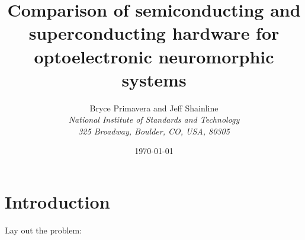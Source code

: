 \documentclass[onecolumn]{article}
\title{Comparison of semiconducting and superconducting hardware for optoelectronic neuromorphic systems}
\author[1]{\Large{Bryce Primavera and Jeff Shainline}
\\
\textit{\large{National Institute of Standards and Technology}}
\\
\vspace{-0.2em}
\textit{\large{325 Broadway, Boulder, CO, USA, 80305}}
\\
}
\date{\today}%
\begin{document}
\maketitle
\begin{abstract}
\vspace{3em}
\end{abstract}

	
\setcounter{tocdepth}{3}
\setcounter{secnumdepth}{4}
\tableofcontents	
	
\section{\label{sec:introduction}Introduction}
Lay out the problem: 
\end{document}
